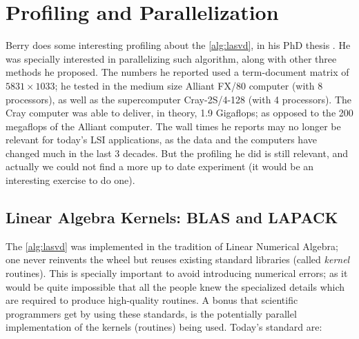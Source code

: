 \section{Profiling and Parallelization}

Berry does some interesting profiling about the \cref{alg:lasvd}, in
his PhD thesis \cite{berry91}. He was specially interested in
parallelizing such algorithm, along with other three methods he
proposed. The numbers he reported used a term-document matrix of 
$5831 \times 1033$; he tested in the medium size Alliant FX/80
computer (with 8 processors), as well as the supercomputer
Cray-2S/4-128 (with 4 processors). The Cray computer was able to
deliver, in theory, 1.9 Gigaflops; as opposed to the 200 megaflops of
the Alliant computer. The wall times he reports may no longer be
relevant for today's LSI applications, as the data and the computers
have changed much in the last 3 decades. But the profiling he did is
still relevant, and actually we could not find a more up to date
experiment (it would be an interesting exercise to do one). \\

\subsection{Linear Algebra Kernels: BLAS and LAPACK}

The \cref{alg:lasvd} was implemented in the tradition of Linear
Numerical Algebra; one never reinvents the wheel but reuses existing
standard libraries (called \emph{kernel} routines). This is specially
important to avoid introducing 
numerical errors; as it would be quite impossible that all the people
knew the specialized details which are required to produce
high-quality routines. A bonus that scientific programmers get by
using these standards, is the potentially parallel implementation of
the kernels (routines) being used. Today's standard are: 

